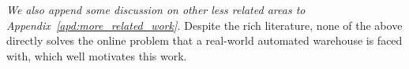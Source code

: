 

\textit{We also append some discussion on other less related areas to Appendix~\ref{apd:more_related_work}.}
Despite the rich literature, none of the above directly solves the online problem that a real-world automated warehouse is faced with, which well motivates this work.